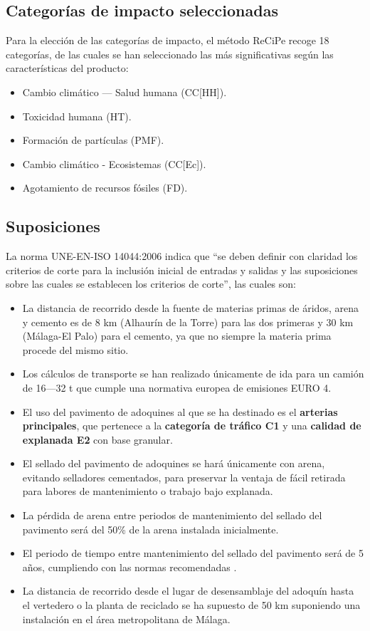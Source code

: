 \subsection{Categorías de impacto seleccionadas}\label{sec:categoriasimpactoseleccionadas}

Para la elección de las categorías de impacto, el método ReCiPe recoge 18 categorías, de las cuales se han seleccionado las más significativas según las características del producto:

\begin{itemize}
  \item Cambio climático — Salud humana (CC[HH]).
  \item Toxicidad humana (HT).
  \item Formación de partículas (PMF).
  \item Cambio climático - Ecosistemas (CC[Ec]).
  \item Agotamiento de recursos fósiles (FD).
\end{itemize}

\subsection{Suposiciones}
La norma UNE-EN-ISO 14044:2006 \cite{iso14044} indica que ``se deben definir con claridad los criterios de corte para la inclusión inicial de entradas y salidas y las suposiciones sobre las cuales se establecen los criterios de corte'', las cuales son:

\begin{itemize}
  \item La distancia de recorrido desde la fuente de materias primas de áridos, arena y cemento es de 8 \si{km} (Alhaurín de la Torre) para las dos primeras y 30 \si{km} (Málaga-El Palo) para el cemento, ya que no siempre la materia prima procede del mismo sitio.
  \item Los cálculos de transporte se han realizado únicamente de ida para un camión de 16—32 \si{\tonne} que cumple una normativa europea de emisiones EURO 4.
  \item El uso del pavimento de adoquines al que se ha destinado es el \textbf{arterias principales}, que pertenece a la \textbf{categoría de tráfico C1} y una \textbf{calidad de explanada E2} con base granular.
  \item El sellado del pavimento de adoquines se hará únicamente con arena, evitando selladores cementados, para preservar la ventaja de fácil retirada para labores de mantenimiento o trabajo bajo explanada.
  \item La pérdida de arena entre periodos de mantenimiento del sellado del pavimento será del 50\% de la arena instalada inicialmente.
  \item El periodo de tiempo entre mantenimiento del sellado del pavimento será de 5 años, cumpliendo con las normas recomendadas \cite{euroadoquinc}.
  \item La distancia de recorrido desde el lugar de desensamblaje del adoquín hasta el vertedero o la planta de reciclado se ha supuesto de 50 \si{km} suponiendo una instalación en el área metropolitana de Málaga.

\end{itemize}

